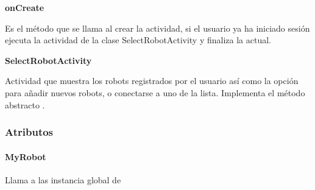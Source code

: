 \textbf{onCreate}
\label{\detokenize{dev_docs:oncreate}}

\begin{fulllineitems}
\label{\detokenize{dev_docs:com.lar.cloudnao.SignInActivity.onCreate(Bundle)}}
Es el método que se llama al crear la actividad, si el usuario ya ha iniciado sesión ejecuta la actividad de la clase SelectRobotActivity y finaliza la actual.

\end{fulllineitems}



\textbf{SelectRobotActivity}
\label{\detokenize{dev_docs:selectrobotactivity}}

\begin{fulllineitems}
\label{\detokenize{dev_docs:com.lar.cloudnao.SelectRobotActivity}}
Actividad que muestra los robots registrados por el usuario así como la opción para añadir nuevos robots, o conectarse a uno de la lista. Implementa el método abstracto .

\end{fulllineitems}



\subsubsection{Atributos}
\label{\detokenize{dev_docs:fields}}

\paragraph{MyRobot}
\label{\detokenize{dev_docs:myrobot}}

\begin{fulllineitems}
\label{\detokenize{dev_docs:com.lar.cloudnao.SelectRobotActivity.MyRobot}}
Llama a las instancia global de {\hyperref[\detokenize{dev_docs:com.lar.cloudnao.Robot}]{}}

\end{fulllineitems}



